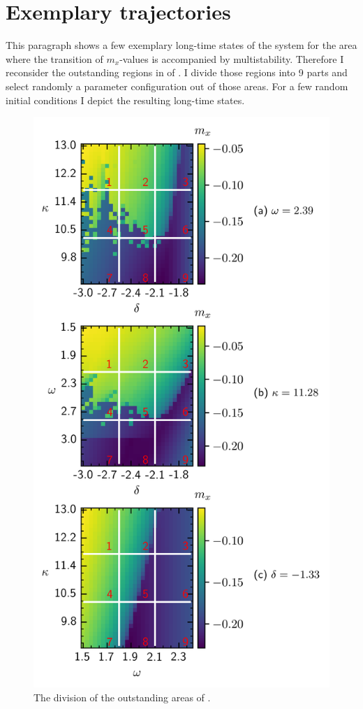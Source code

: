     \section{Exemplary trajectories}
    \label{appendix:expl_traj}
    This paragraph shows a few exemplary long-time states of the system for the area where the transition of $m_x$-values is accompanied by multistability. Therefore I reconsider the outstanding regions in  of . I divide those regions into 9 parts and select randomly a parameter configuration out of those areas. For a few random initial conditions I depict the resulting long-time states.
    \begin{figure}[H]
        \centering
        \includegraphics{pictures/combined_spec_sec.png}
        \caption{The division of the outstanding areas of .}
    \end{figure}
    
